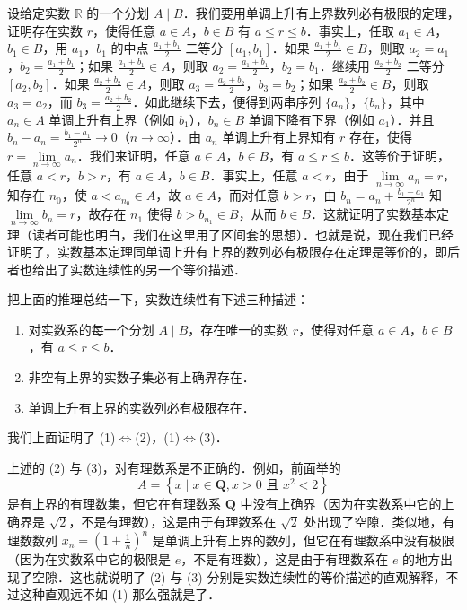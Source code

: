 设给定实数 $\mathbb{R}$ 的一个分划 $A \mid B$．我们要用单调上升有上界数列必有极限的定理，证明存在实数 $r$，使得任意 $a \in A$，$b \in B$ 有 $a \leqslant r \leqslant b$．事实上，任取 $a_1 \in A$，$b_1 \in B$，用 $a_1$，$b_1$ 的中点 $\frac{a_1 + b_1}{2}$ 二等分 $[a_1, b_1]$．如果 $\frac{a_1 + b_1}{2} \in B$，则取 $a_2 = a_1$，$b_2 = \frac{a_1 + b_1}{2}$；如果 $\frac{a_1 + b_1}{2} \in A$，则取 $a_2 = \frac{a_1 + b_1}{2}$，$b_2 = b_1$．继续用 $\frac{a_2 + b_2}{2}$ 二等分 $[a_2, b_2]$．如果 $\frac{a_2 + b_2}{2} \in A$，则取 $a_3 = \frac{a_2 + b_2}{2}$，$b_3 = b_2$；如果 $\frac{a_2 + b_2}{2} \in B$，则取 $a_3 = a_2$，而 $b_3 = \frac{a_2 + b_2}{2}$．如此继续下去，便得到两串序列 $\{a_n\}$，$\{b_n\}$，其中 $a_n \in A$ 单调上升有上界（例如 $b_1$），$b_n \in B$ 单调下降有下界（例如 $a_1$）．并且 $b_n - a_n = \frac{b_1 - a_1}{2^n} \to 0$（$n \to \infty$）．由 $a_n$ 单调上升有上界知有 $r$ 存在，使得 $r = \lim\limits_{n \to \infty} a_n$．我们来证明，任意 $a \in A$，$b \in B$，有 $a \leqslant r \leqslant b$．这等价于证明，任意 $a < r$，$b > r$，有 $a \in A$，$b \in B$．事实上，任意 $a < r$，由于 $\lim\limits_{n \to \infty} a_n = r$，知存在 $n_0$，使 $a < a_{n_0} \in A$，故 $a \in A$，而对任意 $b > r$，由 $b_n = a_n + \frac{b_1 - a_1}{2^n}$ 知 $\lim\limits_{n \to \infty} b_n = r$，故存在 $n_1$ 使得 $b > b_{n_1} \in B$，从而 $b \in B$．这就证明了实数基本定理（读者可能也明白，我们在这里用了区间套的思想）．也就是说，现在我们已经证明了，实数基本定理同单调上升有上界的数列必有极限存在定理是等价的，即后者也给出了实数连续性的另一个等价描述．

把上面的推理总结一下，实数连续性有下述三种描述：
\begin{enumerate}[(1)]
\item 对实数系的每一个分划 $A \mid B$，存在唯一的实数 $r$，使得对任意 $a \in A$，$b \in B$，有 $a \leqslant r \leqslant b$．
\item 非空有上界的实数子集必有上确界存在．
\item 单调上升有上界的实数列必有极限存在．
\end{enumerate}
我们上面证明了 (1)$\Leftrightarrow$(2)，(1)$\Leftrightarrow$(3)．

上述的 (2) 与 (3)，对有理数系是不正确的．例如，前面举的
\[
A = \left\{ x \mid x \in \mathbf{Q}, x > 0 \text{ 且 } x^2 < 2 \right\}
\]
是有上界的有理数集，但它在有理数系 $\mathbf{Q}$ 中没有上确界（因为在实数系中它的上确界是 $\sqrt{2}$，不是有理数），这是由于有理数系在 $\sqrt{2}$ 处出现了空隙．类似地，有理数数列 $x_n = \left( 1 + \frac{1}{n} \right)^n$ 是单调上升有上界的数列，但它在有理数系中没有极限（因为在实数系中它的极限是 $e$，不是有理数），这是由于有理数系在 $e$ 的地方出现了空隙．这也就说明了 (2) 与 (3) 分别是实数连续性的等价描述的直观解释，不过这种直观远不如 (1) 那么强就是了．

